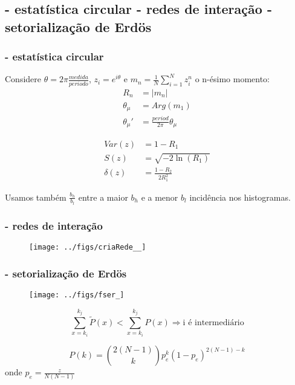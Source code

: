 \documentclass[10pt]{beamer}
\begin{document}
\begin{frame}
\subsection{- estatística circular \;\; - redes de interação \;\; - setorialização de Erdös}
\frametitle{- estatística circular}
Considere $\theta=2\pi \frac{medida}{periodo}$, $z_i= e^{i\theta}$ e $m_n=\frac{1}{N}\sum_{i=1}^N z_i^n$ o n-ésimo momento:
\begin{align}\label{eq:cmom}
    R_n&=|m_n| \nonumber \\
    \theta_\mu&=Arg(m_1) \\
    \theta_\mu'&=\frac{period}{2\pi} \theta_\mu \nonumber
\end{align}

\begin{align}
    Var(z)&=1 - R_1 \nonumber\\
    S(z)&= \sqrt{-2\ln(R_1)}\\
    \delta(z)&=\frac{1-R_2}{2 R_1^2} \nonumber
\end{align}

Usamos também $\frac{b_h}{b_l}$ entre a maior $b_h $ e a menor $b_l$ incidência nos histogramas.

\end{frame}
\begin{frame}
\frametitle{- redes de interação}
\begin{figure}[!h]
    \centering
    \texttt{[image: ../figs/criaRede\_\_]}
\end{figure}
\end{frame}
\begin{frame}
\frametitle{- setorialização de Erdös}

\begin{figure}[!h]
    \centering
    \texttt{[image: ../figs/fser\_]}
        \label{fig:setores}
\end{figure}

\begin{equation}\label{criterio2}
    \sum_{x=k_i}^{k_j} \widetilde{P}(x) < \sum_{x=k_i}^{k_j} P(x) \Rightarrow \text{i é intermediário}
\end{equation}

\begin{equation}
    P(k)=\binom{2(N-1)}{k}p_e^k(1-p_e)^{2(N-1)-k}
\end{equation}
onde 
\centering
$p_e=\frac{z}{N(N-1)}$


\end{frame}
\end{document}

